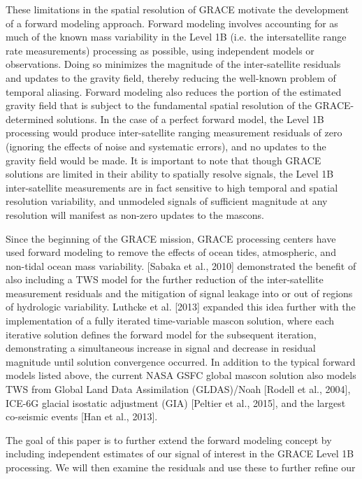 \documentclass[review,oneside]{igs}
\begin{document}
These limitations in the spatial resolution of GRACE motivate the development of a forward modeling approach. Forward modeling involves accounting for as much of the known mass variability in the Level 1B (i.e. the intersatellite range rate measurements) processing as possible, using independent models or observations. Doing so minimizes the magnitude of the inter-satellite residuals and updates to the gravity field, thereby reducing the well-known problem of temporal aliasing. Forward modeling also reduces the portion of the estimated gravity field that is subject to the fundamental spatial resolution of the GRACE-determined solutions. In the case of a perfect forward model, the Level 1B processing would produce inter-satellite ranging measurement residuals of zero (ignoring the effects of noise and systematic errors), and no updates to the gravity field would be made. It is important to note that though GRACE solutions are limited in their ability to spatially resolve signals, the Level 1B inter-satellite measurements are in fact sensitive to high temporal and spatial resolution variability, and unmodeled signals of sufficient magnitude at any resolution will manifest as non-zero updates to the mascons.

Since the beginning of the GRACE mission, GRACE processing centers have used forward modeling to remove the effects of ocean tides, atmospheric, and non-tidal ocean mass variability. [Sabaka et al., 2010] demonstrated the benefit of also including a TWS model for the further reduction of the inter-satellite measurement residuals and the mitigation of signal leakage into or out of regions of hydrologic variability. Luthcke et al. [2013] expanded this idea further with the implementation of a fully iterated time-variable mascon solution, where each iterative solution defines the forward model for the subsequent iteration, demonstrating a simultaneous increase in signal and decrease in residual magnitude until solution convergence occurred. In addition to the typical forward models listed above, the current NASA GSFC global mascon solution also models TWS from Global Land Data Assimilation (GLDAS)/Noah [Rodell et al., 2004], ICE-6G glacial isostatic adjustment (GIA) [Peltier et al., 2015], and the largest co-seismic events [Han et al., 2013]. 

The goal of this paper is to further extend the forward modeling concept by including independent estimates of our signal of interest in the GRACE Level 1B processing. We will then examine the residuals and use these to further refine our   
\end{document}
